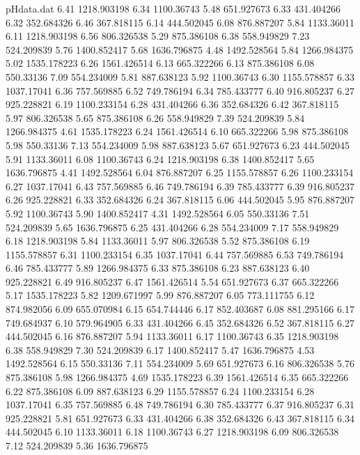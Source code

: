 \begin{filecontents}{pHdata.dat}
6.41 	1218.903198
6.34 	1100.36743
5.48 	651.927673
6.33 	431.404266
6.32 	352.684326
6.46 	367.818115
6.14 	444.502045
6.08 	876.887207
5.84 	1133.36011
6.11 	1218.903198
6.56 	806.326538
5.29 	875.386108
6.38 	558.949829
7.23 	524.209839
5.76 	1400.852417
5.68 	1636.796875
4.48 	1492.528564
5.84 	1266.984375
5.02 	1535.178223
6.26 	1561.426514
6.13 	665.322266
6.13 	875.386108
6.08 	550.33136
7.09 	554.234009
5.81 	887.638123
5.92 	1100.36743
6.30 	1155.578857
6.33 	1037.17041
6.36 	757.569885
6.52 	749.786194
6.34 	785.433777
6.40 	916.805237
6.27 	925.228821
6.19 	1100.233154
6.28 	431.404266
6.36 	352.684326
6.42 	367.818115
5.97 	806.326538
5.65 	875.386108
6.26 	558.949829
7.39 	524.209839
5.84 	1266.984375
4.61 	1535.178223
6.24 	1561.426514
6.10 	665.322266
5.98 	875.386108
5.98 	550.33136
7.13 	554.234009
5.98 	887.638123
5.67 	651.927673
6.23 	444.502045
5.91 	1133.36011
6.08 	1100.36743
6.24 	1218.903198
6.38 	1400.852417
5.65 	1636.796875
4.41 	1492.528564
6.04 	876.887207
6.25 	1155.578857
6.26 	1100.233154
6.27 	1037.17041
6.43 	757.569885
6.46 	749.786194
6.39 	785.433777
6.39 	916.805237
6.26 	925.228821
6.33 	352.684326
6.24 	367.818115
6.06 	444.502045
5.95 	876.887207
5.92 	1100.36743
5.90 	1400.852417
4.31 	1492.528564
6.05 	550.33136
7.51 	524.209839
5.65 	1636.796875
6.25 	431.404266
6.28 	554.234009
7.17 	558.949829
6.18 	1218.903198
5.84 	1133.36011
5.97 	806.326538
5.52 	875.386108
6.19 	1155.578857
6.31 	1100.233154
6.35 	1037.17041
6.44 	757.569885
6.53 	749.786194
6.46 	785.433777
5.89 	1266.984375
6.33 	875.386108
6.23 	887.638123
6.40 	925.228821
6.49 	916.805237
6.47 	1561.426514
5.54 	651.927673
6.37 	665.322266
5.17 	1535.178223
5.82 	1209.671997
5.99 	876.887207
6.05 	773.111755
6.12 	874.982056
6.09 	655.070984
6.15 	654.744446
6.17 	852.403687
6.08 	881.295166
6.17 	749.684937
6.10 	579.964905
6.33 	431.404266
6.45 	352.684326
6.52 	367.818115
6.27 	444.502045
6.16 	876.887207
5.94 	1133.36011
6.17 	1100.36743
6.35 	1218.903198
6.38 	558.949829
7.30 	524.209839
6.17 	1400.852417
5.47 	1636.796875
4.53 	1492.528564
6.15 	550.33136
7.11 	554.234009
5.69 	651.927673
6.16 	806.326538
5.76 	875.386108
5.98 	1266.984375
4.69 	1535.178223
6.39 	1561.426514
6.35 	665.322266
6.22 	875.386108
6.09 	887.638123
6.29 	1155.578857
6.24 	1100.233154
6.28 	1037.17041
6.35 	757.569885
6.48 	749.786194
6.30 	785.433777
6.37 	916.805237
6.31 	925.228821
5.81 	651.927673
6.33 	431.404266
6.38 	352.684326
6.43 	367.818115
6.34 	444.502045
6.10 	1133.36011
6.18 	1100.36743
6.27 	1218.903198
6.09 	806.326538
7.12 	524.209839
5.36 	1636.796875

\end{filecontents}
